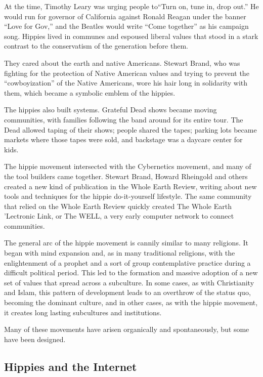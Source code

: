 At the time, Timothy Leary was urging people to``Turn on, tune in, drop out.'' He would run for governor of California against Ronald Reagan under the banner ``Love for Gov,'' and the Beatles would write ``Come together'' as his campaign song. Hippies lived in communes and espoused liberal values that stood in a stark contrast to the conservatism of the generation before them.

They cared about the earth and native Americans. Stewart Brand, who was fighting for the protection of Native American values and trying to prevent the ``cowboyization'' of the Native Americans, wore his hair long in solidarity with them, which became a symbolic emblem of the hippies.

The hippies also built systems. Grateful Dead shows became moving communities, with families following the band around for its entire tour. The Dead allowed taping of their shows; people shared the tapes; parking lots became markets where those tapes were sold, and backstage was a daycare center for kids.

The hippie movement intersected with the Cybernetics movement, and many of the tool builders came together. Stewart Brand, Howard Rheingold and others created a new kind of publication in the Whole Earth Review, writing about new tools and techniques for the hippie do-it-yourself lifestyle. The same community that relied on the Whole Earth Review quickly created The Whole Earth 'Lectronic Link, or The WELL, a very early computer network to connect communities.

The general arc of the hippie movement is cannily similar to many religions. It began with mind expansion and, as in many traditional religions, with the enlightenment of a prophet and a sort of group contemplative practice during a difficult political period. This led to the formation and massive adoption of a new set of values that spread across a subculture. In some cases, as with Christianity and Islam, this pattern of development leads to an overthrow of the status quo, becoming the dominant culture, and in other cases, as with the hippie movement, it creates long lasting subcultures and institutions.

Many of these movements have arisen organically and spontaneously, but some have been designed.

\subsection{Hippies and the Internet}
\label{sec:hippiesinternet}

